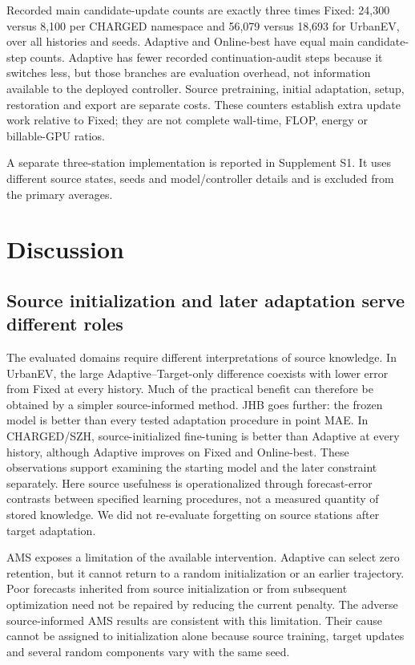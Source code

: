 \documentclass[pdflatex,iicol,sn-mathphys-num]{sn-jnl}
\begin{document}
Recorded main candidate-update counts are exactly three times Fixed: 24,300 versus 8,100 per CHARGED namespace and 56,079 versus 18,693 for UrbanEV, over all histories and seeds. Adaptive and Online-best have equal main candidate-step counts. Adaptive has fewer recorded continuation-audit steps because it switches less, but those branches are evaluation overhead, not information available to the deployed controller. Source pretraining, initial adaptation, setup, restoration and export are separate costs. These counters establish extra update work relative to Fixed; they are not complete wall-time, FLOP, energy or billable-GPU ratios.

A separate three-station implementation is reported in Supplement S1. It uses different source states, seeds and model/controller details and is excluded from the primary averages.

\section{Discussion}\label{sec:discussion}
\subsection{Source initialization and later adaptation serve different roles}
The evaluated domains require different interpretations of source knowledge. In UrbanEV, the large Adaptive--Target-only difference coexists with lower error from Fixed at every history. Much of the practical benefit can therefore be obtained by a simpler source-informed method. JHB goes further: the frozen model is better than every tested adaptation procedure in point MAE. In CHARGED/SZH, source-initialized fine-tuning is better than Adaptive at every history, although Adaptive improves on Fixed and Online-best. These observations support examining the starting model and the later constraint separately. Here source usefulness is operationalized through forecast-error contrasts between specified learning procedures, not a measured quantity of stored knowledge. We did not re-evaluate forgetting on source stations after target adaptation.

AMS exposes a limitation of the available intervention. Adaptive can select zero retention, but it cannot return to a random initialization or an earlier trajectory. Poor forecasts inherited from source initialization or from subsequent optimization need not be repaired by reducing the current penalty. The adverse source-informed AMS results are consistent with this limitation. Their cause cannot be assigned to initialization alone because source training, target updates and several random components vary with the same seed.
\end{document}

